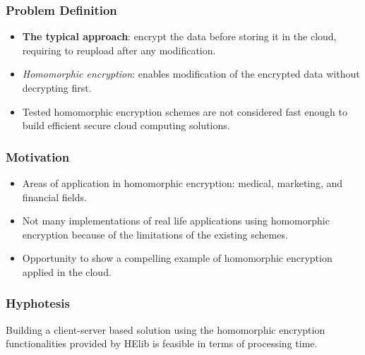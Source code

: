 \documentclass{beamer}
\begin{document}

\begin{frame}
\frametitle{Problem Definition}

\begin{itemize}
  \setlength\itemsep{1.5em}
\item \textbf{The typical approach}: encrypt the data before storing it in the cloud, requiring to reupload after any modification. 
\item \emph{Homomorphic encryption}: enables modification of the encrypted data without decrypting first.
\item  Tested homomorphic encryption schemes are not considered fast enough to build efficient secure cloud computing solutions. 
\end{itemize}
\end{frame}

\begin{frame}
\frametitle{Motivation}

\begin{itemize}
  \setlength\itemsep{1.5em}
\item Areas of application in homomorphic encryption: medical, marketing, and financial fields. 
\item Not many implementations of real life applications using homomorphic encryption because of the limitations of the existing schemes.
\item Opportunity to show a compelling example of homomorphic encryption applied in the cloud.  \end{itemize}
\end{frame}
\begin{frame}
\frametitle{Hyphotesis}

\begin{mdframed}[backgroundcolor=carolinablue]
Building a client-server based solution using the homomorphic encryption functionalities provided by HElib is feasible in terms of processing time.
\end{mdframed}
\end{frame}
\end{document}

